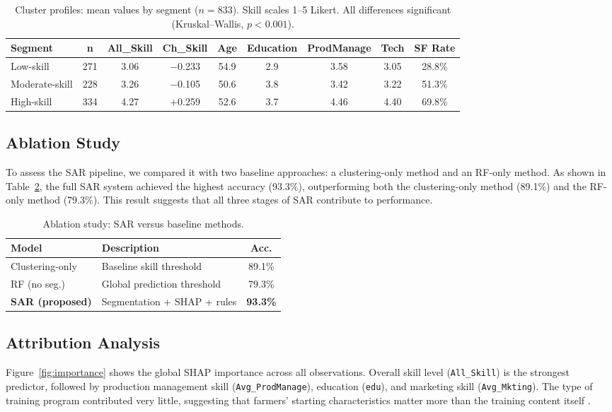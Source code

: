 \documentclass[fleqn,10pt,lineno]{wlpeerj}
\begin{document}
\begin{table}[htbp]
\centering
\caption{Cluster profiles: mean values by segment ($n = 833$). Skill scales 1--5 Likert. All differences significant (Kruskal--Wallis, $p < 0.001$).}
\label{tab:cluster_profile}
\begin{tabular}{@{}lcccccccc@{}}
\toprule
\textbf{Segment} & \textbf{n} & \textbf{All\_Skill} & \textbf{Ch\_Skill} & \textbf{Age} & \textbf{Education} & \textbf{ProdManage} & \textbf{Tech} & \textbf{SF Rate} \\
\midrule
Low-skill      & 271 & 3.06 & $-$0.233 & 54.9 & 2.9 & 3.58 & 3.05 & 28.8\% \\
Moderate-skill & 228 & 3.26 & $-$0.105 & 50.6 & 3.8 & 3.42 & 3.22 & 51.3\% \\
High-skill     & 334 & 4.27 & $+$0.259 & 52.6 & 3.7 & 4.46 & 4.40 & 69.8\% \\
\bottomrule
\end{tabular}
\end{table}

\subsection{Ablation Study}
To assess the SAR pipeline, we compared it with two baseline approaches: a clustering-only method and an RF-only method. As shown in Table~\ref{tab:ablation}, the full SAR system achieved the highest accuracy (93.3\%), outperforming both the clustering-only method (89.1\%) and the RF-only method (79.3\%). This result suggests that all three stages of SAR contribute to performance.

\begin{table}[htbp]
\centering
\caption{Ablation study: SAR versus baseline methods.}
\label{tab:ablation}
\begin{tabular}{@{}llc@{}}
\toprule
\textbf{Model} & \textbf{Description} & \textbf{Acc.} \\
\midrule
Clustering-only & Baseline skill threshold & 89.1\% \\
RF (no seg.) & Global prediction threshold & 79.3\% \\
\textbf{SAR (proposed)} & Segmentation + SHAP + rules & \textbf{93.3\%} \\
\bottomrule
\end{tabular}
\end{table}

\subsection{Attribution Analysis}
Figure~\ref{fig:importance} shows the global SHAP importance across all observations. Overall skill level (\texttt{All\_Skill}) is the strongest predictor, followed by production management skill (\texttt{Avg\_ProdManage}), education (\texttt{edu}), and marketing skill (\texttt{Avg\_Mkting}). The type of training program contributed very little, suggesting that farmers' starting characteristics matter more than the training content itself \citep{ryo2022}.
\end{document}
